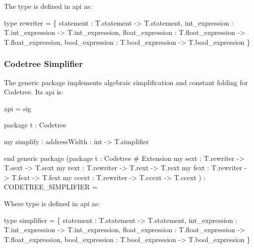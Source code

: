The type  is defined in api
 as:
\begin{SML}
   type rewriter = 
       \{ statement   : T.statement -> T.statement,
         int_expression  : T.int_expression -> T.int_expression,
         float_expression  : T.float_expression -> T.float_expression,
         bool_expression : T.bool_expression -> T.bool_expression
       \} 
\end{SML}
 
\subsubsection{Codetree Simplifier}

The generic package 
implements algebraic simplification and constant folding for Codetree.
Its api is:
\begin{SML}
api  =
sig

   package t : Codetree

   my simplify  :
       { addressWidth : int } -> T.simplifier
   
end
generic package 
  (package t : Codetree
   #  Extension 
   my sext : T.rewriter -> T.sext -> T.sext
   my rext : T.rewriter -> T.rext -> T.rext
   my fext : T.rewriter -> T.fext -> T.fext
   my ccext : T.rewriter -> T.ccext -> T.ccext
  ) : CODETREE_SIMPLIFIER =
\end{SML}

Where type  is defined in api 
 as:
\begin{SML}
   type simplifier =
       \{ statement   : T.statement -> T.statement,
         int_expression  : T.int_expression -> T.int_expression,
         float_expression  : T.float_expression -> T.float_expression,
         bool_expression : T.bool_expression -> T.bool_expression
       \}
\end{SML}


